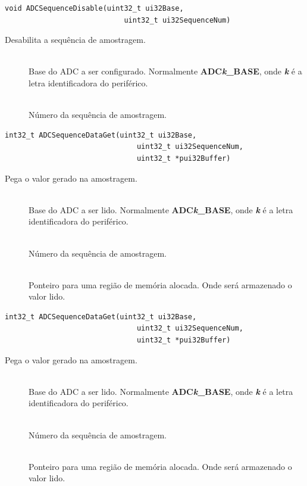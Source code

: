 \begin{lstlisting}[style=funcao]
	void ADCSequenceDisable(uint32_t ui32Base,
							uint32_t ui32SequenceNum)
\end{lstlisting}

Desabilita a sequência de amostragem.

\begin{description}
	\item []\hfill \\
	Base do ADC a ser configurado. Normalmente \textbf{ADC\emph{k}\_BASE}, onde \textbf{\emph{k}} é a letra identificadora do periférico.
	
	\item []\hfill \\
	Número da sequência de amostragem.
\end{description}

\begin{lstlisting}[style=funcao]
	int32_t ADCSequenceDataGet(uint32_t ui32Base,
							   uint32_t ui32SequenceNum,
							   uint32_t *pui32Buffer)
\end{lstlisting}

Pega o valor gerado na amostragem.

\begin{description}
	\item []\hfill \\
	Base do ADC a ser lido. Normalmente \textbf{ADC\emph{k}\_BASE}, onde \textbf{\emph{k}} é a letra identificadora do periférico.
	
	\item []\hfill \\
	Número da sequência de amostragem.
	
	\item []\hfill \\
	Ponteiro para uma região de memória alocada. Onde será armazenado o valor lido.
\end{description}

\begin{lstlisting}[style=funcao]
	int32_t ADCSequenceDataGet(uint32_t ui32Base,
							   uint32_t ui32SequenceNum,
							   uint32_t *pui32Buffer)
\end{lstlisting}

Pega o valor gerado na amostragem.

\begin{description}
	\item []\hfill \\
	Base do ADC a ser lido. Normalmente \textbf{ADC\emph{k}\_BASE}, onde \textbf{\emph{k}} é a letra identificadora do periférico.
	
	\item []\hfill \\
	Número da sequência de amostragem.
	
	\item []\hfill \\
	Ponteiro para uma região de memória alocada. Onde será armazenado o valor lido.
\end{description}

